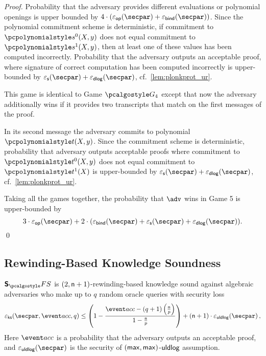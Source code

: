 \begin{proof}
  Probability that the adversary provides different evaluations or polynomial openings is
  upper bounded by $4 \cdot (\epsop (\secpar) + \epsbind (\secpar))$. Since the polynomial
  commitment scheme is deterministic, if commitment to $\p{s^0} (X, y)$ does not equal
  commitment to $\p{s^1} (X, y)$, then at least one of these values has been computed
  incorrectly. Probability that the adversary outputs an acceptable proof, where signature
  of correct computation has been computed incorrectly is upper-bounded by $\epss
  (\secpar) + \epsdlog (\secpar)$, cf.~\cref{lem:plonkprot_ur}.

    This game is identical to Game $\game{4}$ except that now the
  adversary additionally wins if it provides two transcripts that match on the
  first messages of the proof.

   In its second message the adversary commits to polynomial
  $\p{t} (X, y)$. Since the commitment scheme is deterministic, probability that adversary
  outputs acceptable proofs where commitment to $\p{t^0} (X, y)$ does not equal commitment
  to $\p{t^1} (X)$ is upper-bounded by $\epss (\secpar) + \epsdlog (\secpar)$, cf.~\cref{lem:plonkprot_ur}.

   Taking all the games together, the probability that $\adv$ wins
  in Game 5 is upper-bounded by
  \[
    3 \cdot \epsop (\secpar) + 2 \cdot (\epsbind (\secpar) + \epss (\secpar) +
    \epsdlog (\secpar)).
  \]
  \fi
  \qed
\end{proof}

\subsection{Rewinding-Based Knowledge Soundness}
\begin{lemma}
	\label{lem:sonicprot_ss}
  $\sonicprotfs$ is $(2, \mathsf{n} + 1)$-rewinding-based knowledge sound against algebraic adversaries who make up to $q$ random oracle queries with security loss 
  \[
    \epscss(\secpar,\accProb, q) \leq \left(1 - \frac{\accProb - (q + 1) \left( \frac{\noofc}{p}\right)}{1 - \frac{\noofc}{p}}\right) + (\noofc + 1) \cdot \epsuldlog (\secpar)\,,
  \]
	Here $\accProb$ is a probability that the adversary outputs an acceptable proof, and $\epsuldlog(\secpar)$ is the security of $(\mathsf{max}, \mathsf{max})$-$\mathsf{uldlog}$ assumption.
\end{lemma}



